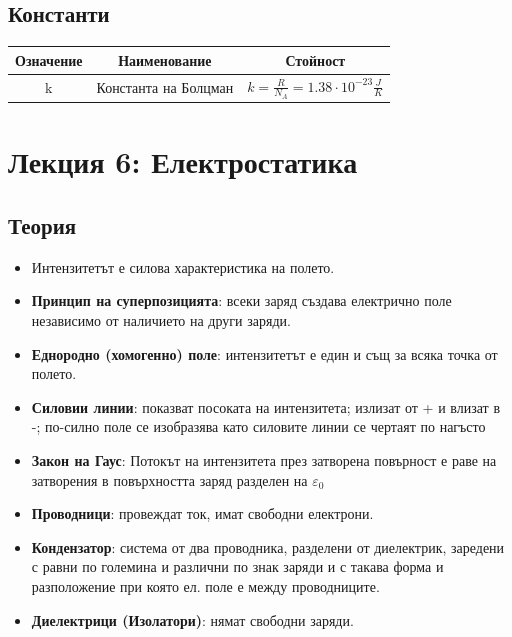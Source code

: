 \documentclass[fleqn, 12pt]{article}
\theoremstyle{definition}
\begin{document}
\newpage
\subsection{Константи}

\begin{center}
\begin{tabular}{ |c|c|c|}
\hline
\textbf{Означение} & \textbf{Наименование}&\textbf{Стойност}\\
\hline
k & Константа на Болцман & $k = \frac{R}{N_A} = 1.38 \cdot 10^{-23} \frac{J}{K}$ \\
\hline
\end{tabular}
\end{center}

\newpage
\section{Лекция 6: Електростатика}

\subsection{Теория}

\begin{itemize}
\item Интензитетът е силова характеристика на полето. 
\item \textbf{Принцип на суперпозицията}: всеки заряд създава електрично поле независимо от наличието на други заряди. 
\item \textbf{Еднородно (хомогенно) поле}: интензитетът е един и същ за всяка точка от полето. 
\item \textbf{Силовии линии}: показват посоката на интензитета; излизат от + и влизат в -; по-силно поле се изобразява като силовите линии се чертаят по нагъсто
\item \textbf{Закон на Гаус}: Потокът на интензитета през затворена повърност е раве на затворения в повърхността заряд разделен на $\varepsilon_0$
\item \textbf{Проводници}: провеждат ток, имат свободни електрони.
\item \textbf{Кондензатор}: система от два проводника, разделени от диелектрик, заредени с равни по големина и различни по знак заряди и с такава форма и разположение при която ел. поле е между проводниците. 
\item \textbf{Диелектрици (Изолатори)}: нямат свободни заряди.
\end{itemize}
\end{document}
